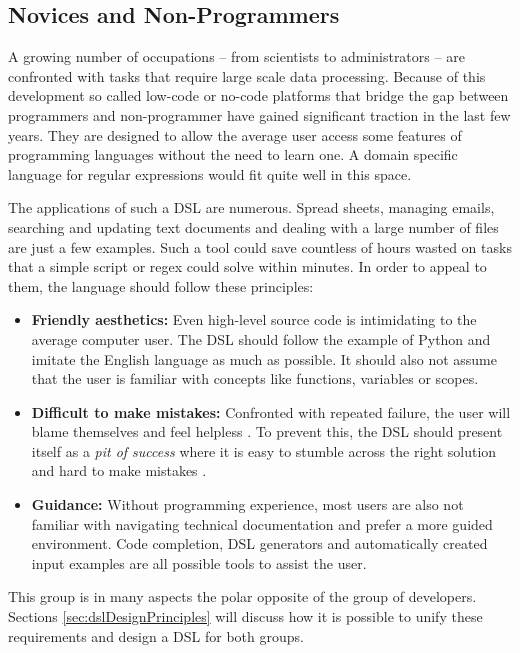 \subsection{Novices and Non-Programmers} \label{sec:demoNovice}

A growing number of occupations -- from scientists to administrators -- are confronted with tasks that require large scale data processing. Because of this development so called low-code or no-code platforms that bridge the gap between programmers and non-programmer have gained significant traction in the last few years. They are designed to allow the average user access some features of programming languages without the need to learn one. A domain specific language for regular expressions would fit quite well in this space.

The applications of such a DSL are numerous. Spread sheets, managing emails, searching and updating text documents and dealing with a large number of files are just a few examples. Such a tool could save countless of hours wasted on tasks that a simple script or regex could solve within minutes. In order to appeal to them, the language should follow these principles:

\begin{itemize}
    \item \textbf{Friendly aesthetics:}
    Even high-level source code is intimidating to the average computer user. The DSL should follow the example of Python and imitate the English language as much as possible. It should also not assume that the user is familiar with concepts like functions, variables or scopes.
    \item \textbf{Difficult to make mistakes:} 
    Confronted with repeated failure, the user will blame themselves and feel helpless \cite{DesignOfEverydayThings}. To prevent this, the DSL should present itself as a \emph{pit of success} where it is easy to stumble across the right solution and hard to make mistakes \cite{PitOfSuccess}.
    \item \textbf{Guidance:}
    Without programming experience, most users are also not familiar with navigating technical documentation and prefer a more guided environment. Code completion, DSL generators and automatically created input examples are all possible tools to assist the user.
\end{itemize}

This group is in many aspects the polar opposite of the group of developers. Sections \ref{sec:dslDesignPrinciples} will discuss how it is possible to unify these requirements and design a DSL for both groups.

